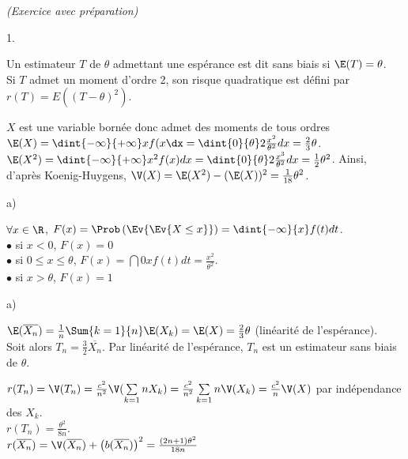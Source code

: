\documentclass[11pt]{article}%
\begin{document}
 \begin{exercice}{\it (Exercice avec préparation)}~
 \begin{noliste}{1.}
 \setlength{\itemsep}{4mm}
 \item Un estimateur $T$ de $\theta$ admettant une espérance est dit
sans biais si $\E(T) = \theta$. \\
 Si $T$ admet un moment d'ordre 2, son risque quadratique est défini
par $r(T) = E((T- \theta)^{2})$.
 \item $X$ est une variable bornée donc admet des moments de tous
ordres\\
 $\E(X) = \dint{-\infty}{+ \infty} x f(x \dx = \dint{0}{\theta}
2\frac{x^{2}}{\theta^{2}}dx = \frac{2}{3} \theta$.\\
 $\E(X^{2}) = \dint{-\infty}{+ \infty} x^{2}f(x)dx = \dint{0}{\theta}
2\frac{x^{3}}{\theta^{2}}dx = \frac{1}{2} \theta^{2}$. Ainsi, d'après
Koenig-Huygens, $\V(X) = \E(X^{2})-(\E(X))^{2} = \frac{1}{18}
\theta^{2}$. 
 \item 
 \begin{noliste}{a)}
 \setlength{\itemsep}{2mm}
 \item $\forall x \in \R$, $F(x) = \Prob\left(\Ev{\Ev{X \leq x
}}\right) = \dint{-\infty}{x} f(t)dt$.\\
 $\bullet$ si $x < 0$, $F(x) = 0$ \\
 $\bullet$ si $ 0 \leq x \leq \theta$, $F(x) = \dint{0}{x} f(t)dt =
\frac{x^{2}}{\theta^{2}}$.\\
 $\bullet$ si $x > \theta$, $F(x) = 1$ 
 \item
 \end{noliste}
 \item \begin{noliste}{a)}
 \setlength{\itemsep}{2mm}
 \item $\E(\overline{X_{n}}) = \frac{1}{n} \Sum{k = 1}{n} \E(X_{k}) =
\E(X) = \frac{2}{3} \theta$ (linéarité de l'espérance). \\
 Soit alors $T_{n} = \frac{3}{2} \overline{X_{n}}$. Par linéarité de
l'espérance, $T_{n}$ est un estimateur sans biais de $\theta$.
 \item $r(T_{n}) = \V(T_{n}) = \frac{c^{2}}{n^{2}} \V(\sum \limits_{k =
1}{n} X_{k}) = \frac{c^{2}}{n^{2}} \sum \limits_{k = 1}{n} \V(X_{k}) =
\frac{c^{2}}{n} \V(X)$ par indépendance des $X_{k}$. \\
 $r(T_{n}) = \frac{\theta^{2}}{8n} $.\\
 $r(\overline{X_{n}}) = \V(\overline{X_{n}}) + \left(
b(\overline{X_{n}})\right)^{2} = \frac{(2n + 1) \theta^{2}}{18n} $ 

\end{noliste}
\end{noliste}
\end{exercice}
\end{document}
